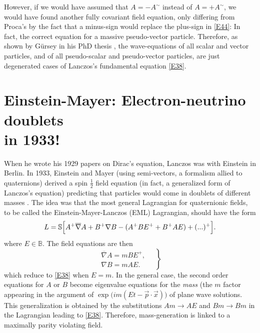 \documentclass [12pt,a4paper      ]{article}
\newcommand{\bbB}{\mathbb{B}}         %
\newcommand{\CON}{\overline}          %
\newcommand{\Scal}{\mathbb{S}}        %
\newcommand{\REV}{\sim}               %
\begin{document}
However, if we would have assumed that  $A=-A^\REV$ instead of  $A=+A^\REV$, we would have found another fully covariant field equation, only differing from Proca's by the fact that a minus-sign would replace the plus-sign in \eqref{E44}: In fact, the correct equation for a massive pseudo-vector particle.  Therefore, as shown by G\"ursey in his PhD thesis \cite{R29}, the  wave-equations  of all scalar  and  vector particles, and of all pseu\-do-scalar  and  pseudo-vector particles, are just degenerated cases of Lanczos's fundamental equation \eqref{E38}.



\section{Einstein-Mayer: Electron-neutrino doublets\\ in 1933!}
\label{ein:0}

     When he wrote his 1929 papers on Dirac's  equation,  Lanczos 
was with Einstein in Berlin.  In 1933,  Einstein and Mayer (using 
semi-vectors,  a  formalism allied to quaternions) derived a spin 
$\tfrac{1}{2}$  field  equation (in fact, a generalized form of Lanczos's 
equation)  predicting  that particles would come in  doublets  of 
different  masses  \cite{R35,R36}.   The  idea was that  the  most  general 
Lagrangian for quaternionic fields, to be called the Einstein-Mayer-Lanczos (EML) Lagrangian, should have the form
%
\begin{equation}\label{E48}
 L = \Scal \Bigl[ A^+\CON{\nabla}A + B^+{\nabla}B  - (A^+ BE^+ + B^+ AE ) + (...)^+  \Bigr].  %
\end{equation}
%
where $E \in \bbB$.  The field equations are then
%
\begin{equation}\label{E49}
\left.
\begin{array}{c}
\CON{\nabla} A = m B E^+, \\    %
\nabla B = m A E.~~
\end{array}
\quad \right\}
\end{equation}
%
which reduce to \eqref{E38} when $E=m$.  In the general case,  the  second 
order  equations  for $A$ or $B$ become eigenvalue equations for  the 
\emph{mass} (the $m$ factor appearing  in  the argument of  $\exp \bigl(im(Et-\vec{p}\cdot\vec{x})\bigr)$ of plane wave solutions. 
This generalization is obtained by the substitutions 
$Am \rightarrow AE$ and $Bm \rightarrow Bm$ in the Lagrangian leading to \eqref{E38}.  Therefore, mass-generation is linked to a maximally parity violating field.
\end{document}
